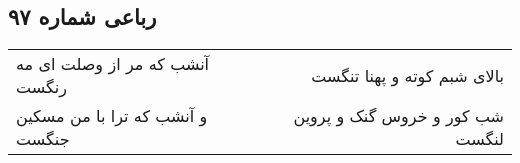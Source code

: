 \begin{center}
\section*{رباعی شماره ۹۷}
\label{sec:sh097}
\begin{longtable}{l p{0.5cm} r}
آنشب که مر از وصلت ای مه رنگست
&&
بالای شبم کوته و پهنا تنگست
\\
و آنشب که ترا با من مسکین جنگست
&&
شب کور و خروس گنک و پروین لنگست
\\
\end{longtable}
\end{center}
